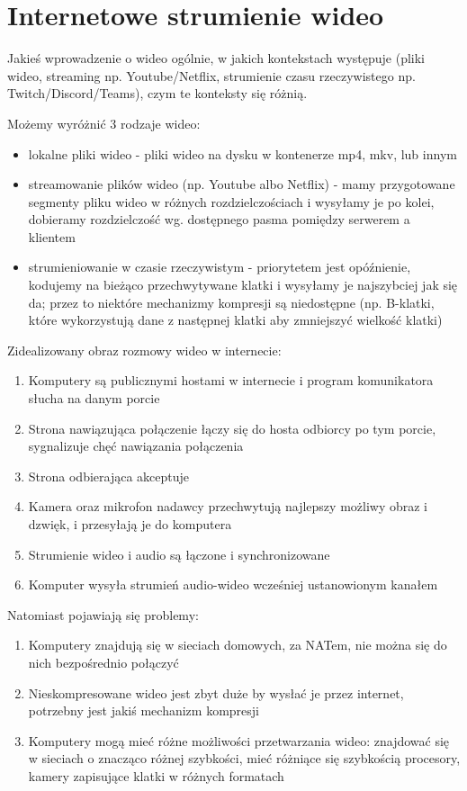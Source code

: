 \chapter{Internetowe strumienie wideo}

Jakieś wprowadzenie o wideo ogólnie, w jakich kontekstach występuje (pliki wideo, streaming np. Youtube/Netflix,
strumienie czasu rzeczywistego np. Twitch/Discord/Teams), czym te konteksty się różnią.

Możemy wyróżnić 3 rodzaje wideo:

\begin{itemize}
	\item lokalne pliki wideo - pliki wideo na dysku w kontenerze mp4, mkv, lub innym
	\item streamowanie plików wideo (np. Youtube albo Netflix) - mamy przygotowane segmenty pliku wideo w różnych
	      rozdzielczościach i wysyłamy je po kolei, dobieramy rozdzielczość wg. dostępnego pasma pomiędzy serwerem a
	      klientem
	\item strumieniowanie w czasie rzeczywistym - priorytetem jest opóźnienie, kodujemy na bieżąco przechwytywane klatki
	      i wysyłamy je najszybciej jak się da; przez to niektóre mechanizmy kompresji są niedostępne (np. B-klatki,
	      które wykorzystują dane z następnej klatki aby zmniejszyć wielkość klatki)
\end{itemize}

Zidealizowany obraz rozmowy wideo w internecie:
\begin{enumerate}
	\item Komputery są publicznymi hostami w internecie i program komunikatora słucha na danym porcie
	\item Strona nawiązująca połączenie łączy się do hosta odbiorcy po tym porcie, sygnalizuje chęć nawiązania
	      połączenia
	\item Strona odbierająca akceptuje
	\item Kamera oraz mikrofon nadawcy przechwytują najlepszy możliwy obraz i dzwięk, i przesyłają je do komputera
	\item Strumienie wideo i audio są łączone i synchronizowane
	\item Komputer wysyła strumień audio-wideo wcześniej ustanowionym kanałem
\end{enumerate}

Natomiast pojawiają się problemy:

\begin{enumerate}
	\item Komputery znajdują się w sieciach domowych, za NATem, nie można się do nich bezpośrednio połączyć
	\item Nieskompresowane wideo jest zbyt duże by wysłać je przez internet, potrzebny jest jakiś mechanizm kompresji
	\item Komputery mogą mieć różne możliwości przetwarzania wideo: znajdować się w sieciach o znacząco różnej
	      szybkości, mieć różniące się szybkością procesory, kamery zapisujące klatki w różnych formatach
\end{enumerate}
